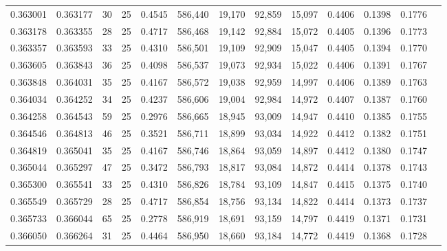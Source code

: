 \begin{tabular}{rrrrrrrrrrrrr}
0.363001 & 0.363177 &    30 &  25 &                                     0.4545 & 586,440 &  19,170 &  92,859 &  15,097 & 0.4406 & 0.1398 & 0.1776 \\
0.363178 & 0.363355 &    28 &  25 &                                     0.4717 & 586,468 &  19,142 &  92,884 &  15,072 & 0.4405 & 0.1396 & 0.1773 \\
0.363357 & 0.363593 &    33 &  25 &                                     0.4310 & 586,501 &  19,109 &  92,909 &  15,047 & 0.4405 & 0.1394 & 0.1770 \\
0.363605 & 0.363843 &    36 &  25 &                                     0.4098 & 586,537 &  19,073 &  92,934 &  15,022 & 0.4406 & 0.1391 & 0.1767 \\
0.363848 & 0.364031 &    35 &  25 &                                     0.4167 & 586,572 &  19,038 &  92,959 &  14,997 & 0.4406 & 0.1389 & 0.1763 \\
0.364034 & 0.364252 &    34 &  25 &                                     0.4237 & 586,606 &  19,004 &  92,984 &  14,972 & 0.4407 & 0.1387 & 0.1760 \\
0.364258 & 0.364543 &    59 &  25 &                                     0.2976 & 586,665 &  18,945 &  93,009 &  14,947 & 0.4410 & 0.1385 & 0.1755 \\
0.364546 & 0.364813 &    46 &  25 &                                     0.3521 & 586,711 &  18,899 &  93,034 &  14,922 & 0.4412 & 0.1382 & 0.1751 \\
0.364819 & 0.365041 &    35 &  25 &                                     0.4167 & 586,746 &  18,864 &  93,059 &  14,897 & 0.4412 & 0.1380 & 0.1747 \\
0.365044 & 0.365297 &    47 &  25 &                                     0.3472 & 586,793 &  18,817 &  93,084 &  14,872 & 0.4414 & 0.1378 & 0.1743 \\
0.365300 & 0.365541 &    33 &  25 &                                     0.4310 & 586,826 &  18,784 &  93,109 &  14,847 & 0.4415 & 0.1375 & 0.1740 \\
0.365549 & 0.365729 &    28 &  25 &                                     0.4717 & 586,854 &  18,756 &  93,134 &  14,822 & 0.4414 & 0.1373 & 0.1737 \\
0.365733 & 0.366044 &    65 &  25 &                                     0.2778 & 586,919 &  18,691 &  93,159 &  14,797 & 0.4419 & 0.1371 & 0.1731 \\
0.366050 & 0.366264 &    31 &  25 &                                     0.4464 & 586,950 &  18,660 &  93,184 &  14,772 & 0.4419 & 0.1368 & 0.1728 \\

\end{tabular}
